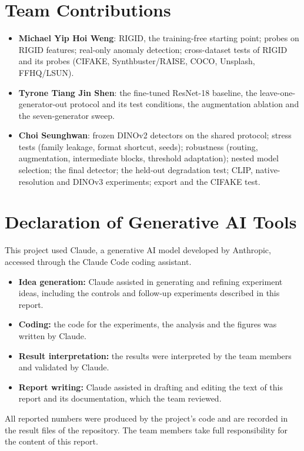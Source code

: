 \documentclass[10pt,a4paper]{article}
\begin{document}
\section{Team Contributions}
\begin{itemize}
  \item \textbf{Michael Yip Hoi Weng}: RIGID, the training-free starting point; probes on RIGID features; real-only anomaly detection; cross-dataset tests of RIGID and its probes (CIFAKE, Synthbuster/RAISE, COCO, Unsplash, FFHQ/LSUN).
  \item \textbf{Tyrone Tiang Jin Shen}: the fine-tuned ResNet-18 baseline, the leave-one-generator-out protocol and its test conditions, the augmentation ablation and the seven-generator sweep.
  \item \textbf{Choi Seunghwan}: frozen DINOv2 detectors on the shared protocol; stress tests (family leakage, format shortcut, seeds); robustness (routing, augmentation, intermediate blocks, threshold adaptation); nested model selection; the final detector; the held-out degradation test; CLIP, native-resolution and DINOv3 experiments; export and the CIFAKE test.
\end{itemize}

\section{Declaration of Generative AI Tools}
This project used Claude, a generative AI model developed by Anthropic, accessed through the Claude Code coding assistant.
\begin{itemize}
  \item \textbf{Idea generation:} Claude assisted in generating and refining experiment ideas, including the controls and follow-up experiments described in this report.
  \item \textbf{Coding:} the code for the experiments, the analysis and the figures was written by Claude.
  \item \textbf{Result interpretation:} the results were interpreted by the team members and validated by Claude.
  \item \textbf{Report writing:} Claude assisted in drafting and editing the text of this report and its documentation, which the team reviewed.
\end{itemize}
All reported numbers were produced by the project's code and are recorded in the result files of the repository. The team members take full responsibility for the content of this report.
\end{document}

